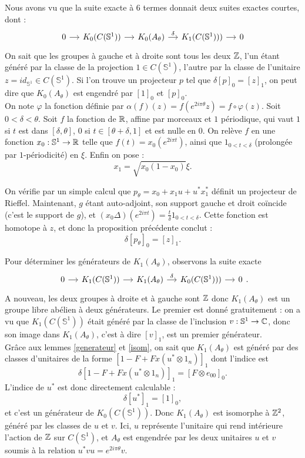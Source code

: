 Nous avons vu que la suite exacte à $6$ termes donnait deux suites exactes courtes, dont :
\[\begin{tikzcd}[column sep = small]0\arrow{r} & K_0(C(\mathbb S^1))\arrow{r}& K_0(A_\theta)\arrow{r}{\delta} & K_1(C(\mathbb S^1)))\arrow{r} & 0   \end{tikzcd}\]
On sait que les groupes à gauche et à droite sont tous les deux $\mathbb Z$, l'un étant généré par la classe de la projection $1\in C(\mathbb S^1)$, l'autre par la classe de l'unitaire $z=id_{\mathbb S^1}\in  C(\mathbb S^1)$. Si l'on trouve un projecteur $p$ tel que $\delta [p]_0=[z]_1$, on peut dire que $K_0(A_\theta)$ est engendré par $[1]_0$ et $[p]_0$.\\

On note $\varphi$ la fonction définie par $\alpha (f) (z) = f(e^{2i\pi\theta}z)=f\circ \varphi (z)$.
Soit $0<\delta<\theta$. Soit $f$ la fonction de $\mathbb R$, affine par morceaux et $1$ périodique, qui vaut $1$ si $t$ est dans $[\delta, \theta]$, $0$ si $t\in [\theta+\delta,1]$ et est nulle en $0$. 
On relève $f$ en une fonction $x_0:\mathbb S^1\rightarrow \mathbb R$ telle que $f(t)=x_0(e^{2i\pi t})$, ainsi que $1_{0<t<\delta}$ (prolongée par $1$-périodicité) en $\xi$. Enfin on pose : 
\[x_1= \sqrt{x_0(1-x_0)} \xi.\]  

On vérifie par un simple calcul que $p_\theta=x_0+x_1 u +u^*x_1^*$ définit un projecteur de Rieffel. Maintenant, $g$ étant auto-adjoint, son support gauche et droit coïncide (c'est le support de $g$), et $(x_0\Delta)(e^{2i\pi t}) = \frac{t}{\delta}1_{0<t<\delta}$. Cette fonction est homotope à $z$, et donc la proposition précédente conclut : 
\[\delta [p_\theta]_0= [z]_1.\]

Pour déterminer les générateurs de $K_1(A_\theta)$, observons la suite exacte 
\[\begin{tikzcd}[column sep = small]0\arrow{r} & K_1(C(\mathbb S^1))\arrow{r}& K_1(A_\theta)\arrow{r}{\delta} & K_0(C(\mathbb S^1)))\arrow{r} & 0   \end{tikzcd}.\]
A nouveau, les deux groupes à droite et à gauche sont $\mathbb Z$ donc $K_1(A_\theta)$ est un groupe libre abélien à deux générateurs. Le premier est donné gratuitement : on a vu que $K_1(C(\mathbb S^1))$ était généré par la classe de l'inclusion $v: \mathbb S^1 \rightarrow \mathbb C$, donc son image dans $K_1(A_\theta)$, c'est à dire $[v]_1$, est un premier générateur. \\
Grâce aux lemmes \ref{generateur} et \ref{isom}, on sait que $K_1(A_\theta)$ est généré par des classes d'unitaires de la forme $[1-F+Fx(u^*\otimes 1_n)]_1$ dont l'indice est 
\[\delta [1-F+Fx(u^*\otimes 1_n)]_1= [F\otimes e_{00}]_0.\]
L'indice de $u^*$ est donc directement calculable :
\[\delta [u^*]_1= [1]_0,\]
et c'est un générateur de $K_0(C(\mathbb S^1))$. Donc $K_1(A_\theta)$ est isomorphe à $\mathbb Z^2$, généré par les classes de $u$ et $v$. Ici, $u$ représente l'unitaire qui rend intérieure l'action de $\mathbb Z$ sur $C(\mathbb S^1)$, et $A_\theta$ est engendrée par les deux unitaires $u$ et $v$ soumis à la relation $u^*vu =e^{2i\pi\theta} v$.\\

